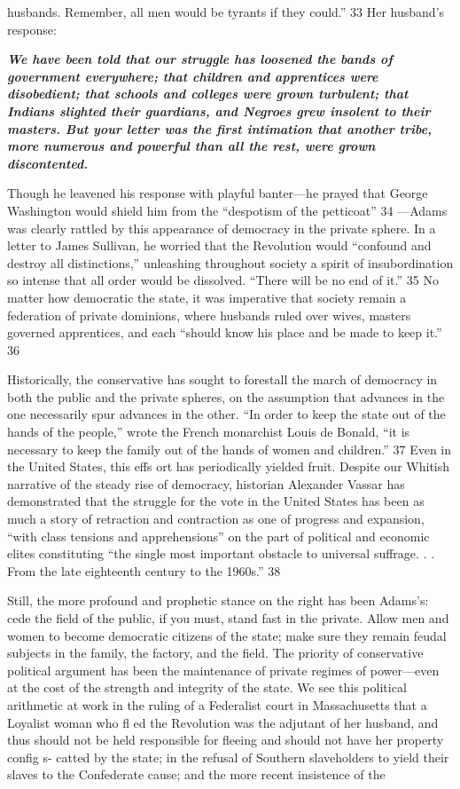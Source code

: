 husbands. Remember, all men would be tyrants if they could.” {\color{blue} 33 } Her husband’s response:{\par} {\textbf{\textit{We have been told that our struggle has loosened the bands of government everywhere; that children and apprentices were disobedient; that schools and colleges were grown turbulent; that Indians slighted their guardians, and Negroes grew insolent to their masters. But your letter was the first intimation that another tribe, more numerous and powerful than all the rest, were grown discontented.} } }{\par} Though he leavened his response with playful banter—he prayed that George Washington would shield him from the “despotism of the petticoat” {\color{blue} 34 } —Adams was clearly rattled by this appearance of democracy in the private sphere. In a letter to James Sullivan, he worried that the Revolution would “confound and destroy all distinctions,” unleashing throughout society a spirit of insubordination so intense that all order would be dissolved. “There will be no end of it.” {\color{blue} 35 } No matter how democratic the state, it was imperative that society remain a federation of private dominions, where husbands ruled over wives, masters governed apprentices, and each “should know his place and be made to keep it.” {\color{blue} 36 } {\par} Historically, the conservative has sought to forestall the march of democracy in both the public and the private spheres, on the assumption that advances in the one necessarily spur advances in the other. “In order to keep the state out of the hands of the people,” wrote the French monarchist Louis de Bonald, “it is necessary to keep the family out of the hands of women and children.” {\color{blue} 37 } Even in the United States, this effs ort has periodically yielded fruit. Despite our Whitish narrative of the steady rise of democracy, historian Alexander Vassar has demonstrated that the struggle for the vote in the United States has been as much a story of retraction and contraction as one of progress and expansion, “with class tensions and apprehensions” on the part of political and economic elites constituting “the single most important obstacle to universal suffrage. . . From the late eighteenth century to the 1960s.” {\color{blue} 38 } {\par} Still, the more profound and prophetic stance on the right has been Adams’s: cede the field of the public, if you must, stand fast in the private. Allow men and women to become democratic citizens of the state; make sure they remain feudal subjects in the family, the factory, and the field. The priority of conservative political argument has been the maintenance of private regimes of power—even at the cost of the strength and integrity of the state. We see this political arithmetic at work in the ruling of a Federalist court in Massachusetts that a Loyalist woman who fl ed the Revolution was the adjutant of her husband, and thus should not be held responsible for fleeing and should not have her property config s- catted by the state; in the refusal of Southern slaveholders to yield their slaves to the Confederate cause; and the more recent insistence of the 